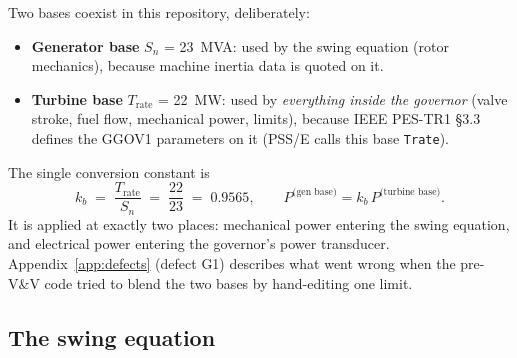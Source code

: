 \documentclass[11pt]{article}
\begin{document}
Two bases coexist in this repository, deliberately:
\begin{itemize}[nosep]
  \item \textbf{Generator base} $S_n$ = \SI{23}{MVA}: used by the swing
    equation (rotor mechanics), because machine inertia data is quoted on
    it.
  \item \textbf{Turbine base} $T_\text{rate}$ = \SI{22}{MW}: used by
    \emph{everything inside the governor} (valve stroke, fuel flow,
    mechanical power, limits), because IEEE PES-TR1 \S3.3 defines the
    GGOV1 parameters on it (PSS/E calls this base \texttt{Trate}).
\end{itemize}
The single conversion constant is
\begin{equation}
  k_b \;=\; \frac{T_\text{rate}}{S_n} \;=\; \frac{22}{23} \;=\; 0.9565,
  \qquad
  P^{\text{(gen base)}} = k_b \, P^{\text{(turbine base)}} .
  \label{eq:kb}
\end{equation}
It is applied at exactly two places: mechanical power entering the swing
equation, and electrical power entering the governor's power transducer.
Appendix~\ref{app:defects} (defect G1) describes what went wrong when the
pre-V\&V code tried to blend the two bases by hand-editing one limit.

\subsection{The swing equation}
\label{sec:swing}
\end{document}
